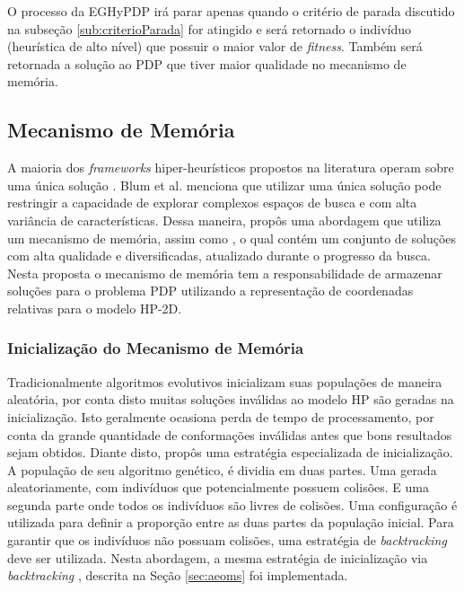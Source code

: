 

O processo da EGHyPDP irá parar apenas quando o critério de parada discutido na subseção \ref{sub:criterioParada} for atingido e será retornado o indivíduo (heurística de alto nível) que possuir o maior valor de \textit{fitness}. Também será retornada a solução ao PDP que tiver maior qualidade no mecanismo de memória.



\subsection{Mecanismo de Memória}
\label{sub:MecanismoDeMemoria}

A maioria dos \textit{frameworks} hiper-heurísticos propostos na literatura operam sobre uma única solução \cite{chakhlevitch2008hyperheuristics, burke2013hyper}. Blum et al. \cite{blum2011hybrid} menciona que utilizar uma única solução pode restringir a capacidade de explorar complexos espaços de busca e com alta variância de características. Dessa maneira,  \cite{sabar2015automatic} propôs uma abordagem que utiliza um mecanismo de memória, assim como  \cite{talbi2006cosearch}, o qual contém um conjunto de soluções com alta qualidade e diversificadas, atualizado durante o progresso da busca. Nesta proposta o mecanismo de memória tem a responsabilidade de armazenar soluções para o problema PDP utilizando a representação de coordenadas relativas para o modelo HP-2D. 

\subsubsection{Inicialização do Mecanismo de Memória}

Tradicionalmente algoritmos evolutivos inicializam suas populações de maneira aleatória, por conta disto  muitas soluções inválidas ao modelo HP são geradas na inicialização. Isto geralmente  ocasiona perda de tempo de processamento, por conta da grande quantidade de conformações inválidas antes que bons resultados sejam obtidos. Diante disto, \cite{benitez2015algoritmo} propôs uma estratégia especializada de inicialização. A população de seu algoritmo genético, é dividia em duas partes. Uma gerada aleatoriamente, com indivíduos que potencialmente possuem colisões. E uma segunda parte onde todos os indivíduos são livres de colisões. Uma configuração é utilizada para definir a proporção entre as duas partes da população inicial. Para garantir que os indivíduos não possuam colisões, uma estratégia de \textit{backtracking} deve ser utilizada. Nesta abordagem, a mesma estratégia de inicialização via \textit{backtracking }, descrita  na Seção \ref{sec:aeoms} foi implementada.





